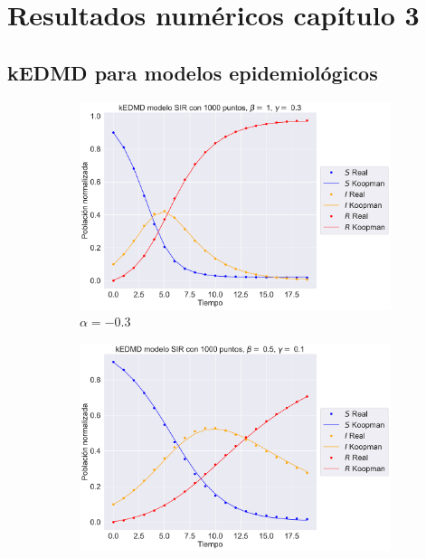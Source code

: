 \chapter{Resultados numéricos capítulo 3}

\section{kEDMD para modelos epidemiológicos}

\begin{figure}[htbp]
    \centering
    \begin{subfigure}[b]{0.45\textwidth}
        \centering
        \includegraphics[width=\textwidth]{img/content/chapter3/SIR1.pdf}
        \caption{$\alpha=-0.3$}
        \label{fig:image1}
    \end{subfigure}
    \hfill
    \begin{subfigure}[b]{0.45\textwidth}
        \centering
        \includegraphics[width=\textwidth]{img/content/chapter3/SIR2.pdf}

\end{subfigure}
\end{figure}
